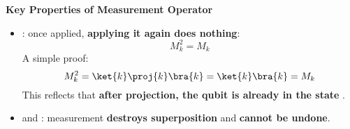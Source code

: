 \highspace
\begin{flushleft}
  \textcolor{Green3}{ \textbf{Key Properties of Measurement Operator}}
\end{flushleft}
\begin{itemize}
  \item {}: once applied, \textbf{applying it again does nothing}:
  \begin{equation*}
    M_{k}^{2} = M_{k}
  \end{equation*}
  A simple proof:
  \begin{equation*}
    M_{k}^{2} = \ket{k} \proj{k} \bra{k} = \ket{k}\bra{k} = M_{k}
  \end{equation*}
  This reflects that \textbf{after projection, the qubit is already in the state} .

  \item {} and : measurement \textbf{destroys superposition} and \textbf{cannot be undone}.
\end{itemize}
